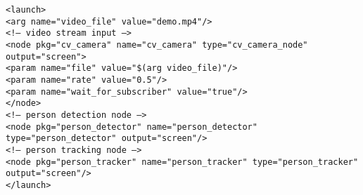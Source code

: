 \begin{description}[leftmargin=0in, labelindent=0pt]
{\begin{itemize}
{\texttt{\textless{}launch\textgreater}\\   
\hspace*{2em}\texttt{\textless{}arg name="video\_file" value="demo.mp4"/\textgreater}\\   
\hspace*{2em}\texttt{\textless{}!--- video stream input ---\textgreater}\\   
\hspace*{2em}\texttt{\textless{}node pkg="cv\_camera" name="cv\_camera" type="cv\_camera\_node" output="screen"\textgreater}\\     
\hspace*{4em}\texttt{\textless{}param name="file" value="\$(arg video\_file)"/\textgreater}\\     
\hspace*{4em}\texttt{\textless{}param name="rate" value="0.5"/\textgreater}\\     
\hspace*{4em}\texttt{\textless{}param name="wait\_for\_subscriber" value="true"/\textgreater}\\   
\hspace*{2em}\texttt{\textless{}/node\textgreater}\\ 
\hspace*{2em}\texttt{\textless{}!--- person detection node ---\textgreater}\\   
\hspace*{2em}\texttt{\textless{}node pkg="person\_detector" name="person\_detector" type="person\_detector" output="screen"/\textgreater}\\ 
\hspace*{2em}\texttt{\textless{}!--- person tracking node ---\textgreater}\\   
\hspace*{2em}\texttt{\textless{}node pkg="person\_tracker" name="person\_tracker" type="person\_tracker" output="screen"/\textgreater}\\
\texttt{\textless{}/launch\textgreater{}}                                                                                                                                                                                                                                                                                                                                                                                                                                                                                                                                                                  }


\end{itemize}}
\end{description}
